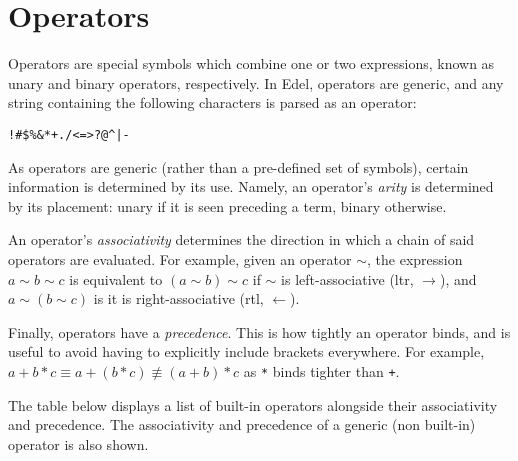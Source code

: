 \section{Operators}\label{sec:operators}

Operators are special symbols which combine one or two expressions, known as unary and binary operators, respectively.
In Edel, operators are generic, and any string containing the following characters is parsed as an operator:

\begin{center}
    \texttt{!\#\$\%\&*+./<=>?@{\string^}|-~}
\end{center}

As operators are generic (rather than a pre-defined set of symbols), certain information is determined by its use.
Namely, an operator's \textit{arity} is determined by its placement: unary if it is seen preceding a term, binary otherwise.

An operator's \textit{associativity} determines the direction in which a chain of said operators are evaluated.
For example, given an operator \(\sim\), the expression \(a \sim b \sim c\) is equivalent to \((a \sim b) \sim c\) if \(\sim\) is left-associative (ltr, \(\longrightarrow\)), and \(a \sim (b \sim c)\) is it is right-associative (rtl, \(\longleftarrow\)).

Finally, operators have a \textit{precedence}.
This is how tightly an operator binds, and is useful to avoid having to explicitly include brackets everywhere.
For example, \(a + b * c \equiv a + (b * c) \not \equiv (a + b) * c\) as \texttt{*} binds tighter than \texttt{+}.

The table below displays a list of built-in operators alongside their associativity and precedence.
The associativity and precedence of a generic (non built-in) operator is also shown.

